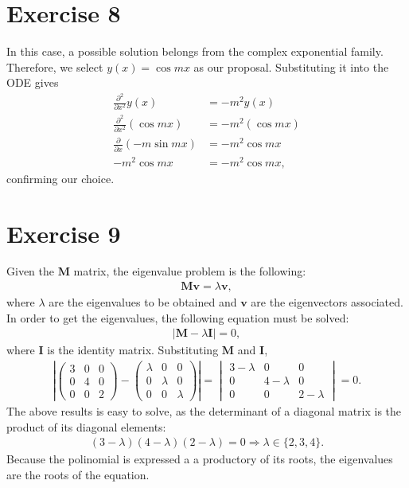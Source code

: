 \documentclass[letterpaper,11pt,twoside]{article}
\begin{document}
\section{Exercise 8}
In this case, a possible solution belongs from the complex exponential family. Therefore, we select $y(x)=\cos mx$ as our proposal. 
Substituting it into the ODE gives
\begin{align*}
  \frac{\partial^2}{\partial x^2}y(x)&=-m^2y(x)\\
  \frac{\partial^2}{\partial x^2}(\cos mx)&=-m^2(\cos mx)\\
  \frac{\partial}{\partial x}(-m\sin mx)&=-m^2\cos mx\\
  -m^2\cos mx&=-m^2\cos mx,
\end{align*}
confirming our choice.
\section{Exercise 9}
Given the $\bm{M}$ matrix, the eigenvalue problem is the following:
\begin{align*}
  \bm{M}\bm{v}=\lambda\bm{v},
\end{align*}
where $\lambda$ are the eigenvalues to be obtained and $\bm{v}$ are the eigenvectors associated.
In order to get the eigenvalues, the following equation must be solved:
\begin{align*}
  |\bm{M}-\lambda\bm{I}|=0,
\end{align*}
where $\bm{I}$ is the identity matrix. Substituting $\bm{M}$ and $\bm{I}$,
\begin{align*}
  \left|\begin{pmatrix}
    3&0&0\\0&4&0\\0&0&2
  \end{pmatrix}-\begin{pmatrix}
    \lambda&0&0\\0&\lambda&0\\0&0&\lambda
  \end{pmatrix}\right|=\begin{vmatrix}
    3-\lambda&0&0\\0&4-\lambda&0\\0&0&2-\lambda
  \end{vmatrix}=0.
\end{align*}
The above results is easy to solve, as the determinant of a diagonal matrix is the product of its diagonal elements:
\begin{align}
  (3-\lambda)(4-\lambda)(2-\lambda)=0\Longrightarrow\lambda\in\{2,3,4\}.
\end{align}
Because the polinomial is expressed a a productory of its roots, the eigenvalues are the roots of the equation.
\end{document}
